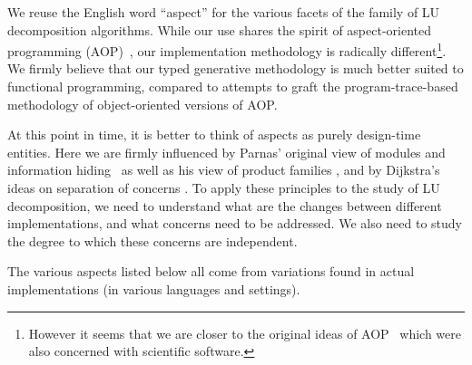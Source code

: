 \documentclass{elsart}
\begin{document}
We reuse the English word ``aspect'' for the various facets of the family
of LU decomposition algorithms.  While our use shares the 
spirit of aspect-oriented programming (AOP)~\cite{kiczales97aspectoriented},
our implementation methodology is radically different\footnote{However it seems
that we are closer to the original ideas of AOP~\cite{709568,mendhekar97rg}
which were also concerned with scientific software.}.  We firmly believe that
our typed generative methodology is much better suited to functional
programming, compared to attempts to graft the program-trace-based
methodology of object-oriented versions of AOP.  

At this point in time, it is better to think of aspects as purely
design-time entities.  Here we are firmly influenced by Parnas' original
view of modules and information hiding~\cite{journals/cacm/parnas72a} as well
as his view of product families \cite{journals/tse/Parnas76}, and by
Dijkstra's ideas on separation of concerns \cite{EWD:EWD447}.
To apply these principles to the study of LU decomposition, we need
to understand what are the changes between different implementations, and 
what concerns need to be addressed.  We also need to study the degree
to which these concerns are independent.

The various aspects listed below all come from variations found in actual
implementations (in various languages and settings).
\end{document}
